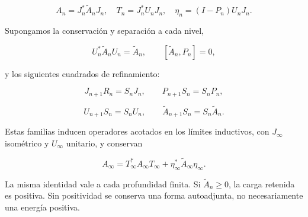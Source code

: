 \[
A_n=J_n^*\widetilde A_nJ_n,\quad
T_n=J_n^*U_nJ_n,\quad
\eta_n=(I-P_n)U_nJ_n.
\]

Supongamos la conservación y separación a cada nivel,

\begin{equation}
U_n^*\widetilde A_nU_n=\widetilde A_n,
\qquad [\widetilde A_n,P_n]=0,
\label{x_reciprocidad:nuc01:eq:8}
\end{equation}

y los siguientes cuadrados de refinamiento:

\begin{equation}
J_{n+1}R_n=S_nJ_n,\qquad
P_{n+1}S_n=S_nP_n,
\label{x_reciprocidad:nuc01:eq:9}
\end{equation}

\begin{equation}
U_{n+1}S_n=S_nU_n,\qquad
\widetilde A_{n+1}S_n=S_n\widetilde A_n.
\label{x_reciprocidad:nuc01:eq:10}
\end{equation}

\begin{theorem}
Estas familias inducen operadores acotados en los límites inductivos, con \(J_\infty\) isométrico y \(U_\infty\) unitario, y conservan

\begin{equation}
A_\infty
=T_\infty^*A_\infty T_\infty
 +\eta_\infty^*\widetilde A_\infty\eta_\infty.
\label{x_reciprocidad:nuc01:eq:11}
\end{equation}

La misma identidad vale a cada profundidad finita. Si \(\widetilde A_n\geq0\), la carga retenida es positiva. Sin positividad se conserva una forma autoadjunta, no necesariamente una energía positiva.
\end{theorem}

